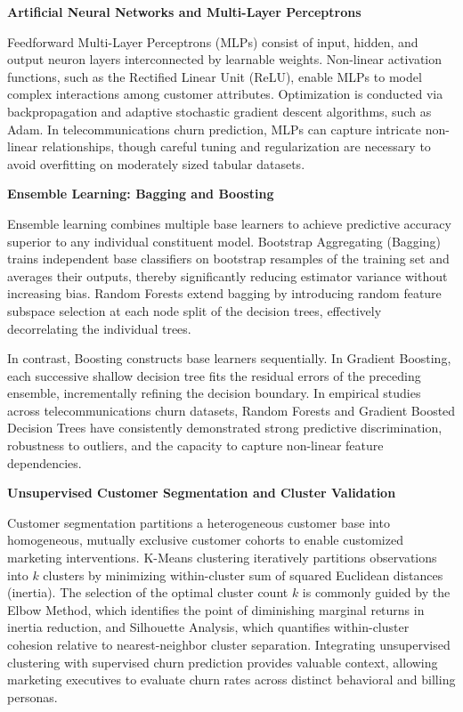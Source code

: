 \documentclass[12pt,oneside]{report}
\begin{document}
\textbf{Artificial Neural Networks and Multi-Layer Perceptrons}

Feedforward Multi-Layer Perceptrons (MLPs) consist of input, hidden, and output neuron layers interconnected by learnable weights. Non-linear activation functions, such as the Rectified Linear Unit (ReLU), enable MLPs to model complex interactions among customer attributes. Optimization is conducted via backpropagation and adaptive stochastic gradient descent algorithms, such as Adam. In telecommunications churn prediction, MLPs can capture intricate non-linear relationships, though careful tuning and regularization are necessary to avoid overfitting on moderately sized tabular datasets.

\textbf{Ensemble Learning: Bagging and Boosting}

Ensemble learning combines multiple base learners to achieve predictive accuracy superior to any individual constituent model. Bootstrap Aggregating (Bagging) trains independent base classifiers on bootstrap resamples of the training set and averages their outputs, thereby significantly reducing estimator variance without increasing bias. Random Forests extend bagging by introducing random feature subspace selection at each node split of the decision trees, effectively decorrelating the individual trees. 

In contrast, Boosting constructs base learners sequentially. In Gradient Boosting, each successive shallow decision tree fits the residual errors of the preceding ensemble, incrementally refining the decision boundary. In empirical studies across telecommunications churn datasets, Random Forests and Gradient Boosted Decision Trees have consistently demonstrated strong predictive discrimination, robustness to outliers, and the capacity to capture non-linear feature dependencies.

\textbf{Unsupervised Customer Segmentation and Cluster Validation}

Customer segmentation partitions a heterogeneous customer base into homogeneous, mutually exclusive customer cohorts to enable customized marketing interventions. K-Means clustering iteratively partitions observations into $k$ clusters by minimizing within-cluster sum of squared Euclidean distances (inertia). The selection of the optimal cluster count $k$ is commonly guided by the Elbow Method, which identifies the point of diminishing marginal returns in inertia reduction, and Silhouette Analysis, which quantifies within-cluster cohesion relative to nearest-neighbor cluster separation. Integrating unsupervised clustering with supervised churn prediction provides valuable context, allowing marketing executives to evaluate churn rates across distinct behavioral and billing personas.
\end{document}
